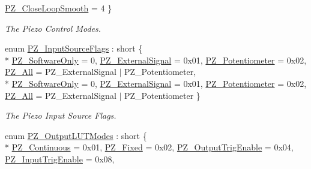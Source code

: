 \begin{DoxyCompactItemize}
\hyperlink{group___common_ggaa4ff718266308759b2633c56c9a813b1ac9c6d9fe59ecf67a3d4c39b21f2afcdf}{P\+Z\+\_\+\+Close\+Loop\+Smooth} = 4
 \}\begin{DoxyCompactList}\small\item\em The Piezo Control Modes. \end{DoxyCompactList}
\item 
enum \hyperlink{group___common_ga695c409512b2dd48c64f0e8e6ee823c0}{P\+Z\+\_\+\+Input\+Source\+Flags} \+: short \{ \\*
\hyperlink{group___common_gga695c409512b2dd48c64f0e8e6ee823c0ace91f336d4ae004c588a710e332c22ad}{P\+Z\+\_\+\+Software\+Only} = 0, 
\hyperlink{group___common_gga695c409512b2dd48c64f0e8e6ee823c0a83301e0b17e97134d5e8c147ec68a80a}{P\+Z\+\_\+\+External\+Signal} = 0x01, 
\hyperlink{group___common_gga695c409512b2dd48c64f0e8e6ee823c0a86e62401ab600ff73b7792cdf0c6246a}{P\+Z\+\_\+\+Potentiometer} = 0x02, 
\hyperlink{group___common_gga695c409512b2dd48c64f0e8e6ee823c0a0c22aa33c92539c66a45de30c6c6820c}{P\+Z\+\_\+\+All} = P\+Z\+\_\+\+External\+Signal $\vert$ P\+Z\+\_\+\+Potentiometer, 
\\*
\hyperlink{group___common_gga695c409512b2dd48c64f0e8e6ee823c0ace91f336d4ae004c588a710e332c22ad}{P\+Z\+\_\+\+Software\+Only} = 0, 
\hyperlink{group___common_gga695c409512b2dd48c64f0e8e6ee823c0a83301e0b17e97134d5e8c147ec68a80a}{P\+Z\+\_\+\+External\+Signal} = 0x01, 
\hyperlink{group___common_gga695c409512b2dd48c64f0e8e6ee823c0a86e62401ab600ff73b7792cdf0c6246a}{P\+Z\+\_\+\+Potentiometer} = 0x02, 
\hyperlink{group___common_gga695c409512b2dd48c64f0e8e6ee823c0a0c22aa33c92539c66a45de30c6c6820c}{P\+Z\+\_\+\+All} = P\+Z\+\_\+\+External\+Signal $\vert$ P\+Z\+\_\+\+Potentiometer
 \}\begin{DoxyCompactList}\small\item\em The Piezo Input Source Flags. \end{DoxyCompactList}
\item 
enum \hyperlink{group___common_ga112996f7606729ecb26937393496d178}{P\+Z\+\_\+\+Output\+L\+U\+T\+Modes} \+: short \{ \\*
\hyperlink{group___common_gga112996f7606729ecb26937393496d178ad81de3e6ce239263b90d4b88640f54d3}{P\+Z\+\_\+\+Continuous} = 0x01, 
\hyperlink{group___common_gga112996f7606729ecb26937393496d178a8bdaf79e60f9b6a0b8fc0cc15f3828f2}{P\+Z\+\_\+\+Fixed} = 0x02, 
\hyperlink{group___common_gga112996f7606729ecb26937393496d178a6df654c25852855ebdb7d416f5dd128d}{P\+Z\+\_\+\+Output\+Trig\+Enable} = 0x04, 
\hyperlink{group___common_gga112996f7606729ecb26937393496d178a6b4bbb193b42cad1944ada4c6e6f4fd2}{P\+Z\+\_\+\+Input\+Trig\+Enable} = 0x08, 

\end{DoxyCompactItemize}
